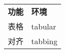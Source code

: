 \documentclass[nofonts]{ctexart}
\begin{document}
\begin{tabular}{ll}
	\bfseries 功能	& \bfseries 环境	\\
	表格			& \ttfamily tabular	\\
	对齐			& \ttfamily	tabbing	\\
\end{tabular}
\end{document}
